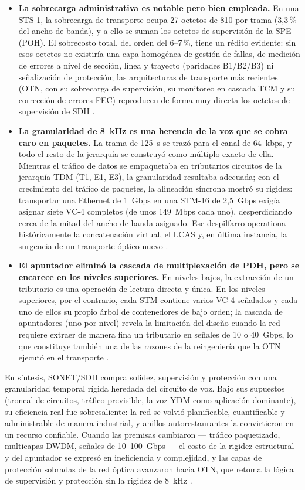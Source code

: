 \documentclass[12pt,a4paper]{article}
\begin{document}
\begin{itemize}
    \item \textbf{La sobrecarga administrativa es notable pero bien empleada.} En una STS-1, la sobrecarga de transporte ocupa 27 octetos de 810 por trama (3{,}3\,\% del ancho de banda), y a ello se suman los octetos de supervisión de la SPE (POH). El sobrecosto total, del orden del 6--7\,\%, tiene un rédito evidente: sin esos octetos no existiría una capa homogénea de gestión de fallas, de medición de errores a nivel de sección, línea y trayecto (paridades B1/B2/B3) ni señalización de protección; las arquitecturas de transporte más recientes (OTN, con su sobrecarga de supervisión, su monitoreo en cascada TCM y su corrección de errores FEC) reproducen de forma muy directa los octetos de supervisión de SDH \cite{itug707, ituG803, ituotn}.
    \item \textbf{La granularidad de 8~kHz es una herencia de la voz que se cobra caro en paquetes.} La trama de 125~\textmu s se trazó para el canal de 64~kbps, y todo el resto de la jerarquía se construyó como múltiplo exacto de ella. Mientras el tráfico de datos se empaquetaba en tributarios circuitos de la jerarquía TDM (T1, E1, E3), la granularidad resultaba adecuada; con el crecimiento del tráfico de paquetes, la alineación síncrona mostró su rigidez: transportar una Ethernet de 1~Gbps en una STM-16 de 2{,}5~Gbps exigía asignar siete VC-4 completos (de unos 149~Mbps cada uno), desperdiciando cerca de la mitad del ancho de banda asignado. Ese despilfarro operationa históricamente la concatenación virtual, el LCAS y, en última instancia, la surgencia de un transporte óptico nuevo \cite{itug707, ituotn}.
    \item \textbf{El apuntador eliminó la cascada de multiplexación de PDH, pero se encarece en los niveles superiores.} En niveles bajos, la extracción de un tributario es una operación de lectura directa y única. En los niveles superiores, por el contrario, cada STM contiene varios VC-4 señalados y cada uno de ellos su propio árbol de contenedores de bajo orden; la cascada de apuntadores (uno por nivel) revela la limitación del diseño cuando la red requiere extraer de manera fina un tributario en señales de 10 o 40~Gbps, lo que constituye también una de las razones de la reingeniería que la OTN ejecutó en el transporte \cite{ituotn}.
\end{itemize}

En síntesis, SONET/SDH compra solidez, supervisión y protección con una granularidad temporal rígida heredada del circuito de voz. Bajo sus supuestos (troncal de circuitos, tráfico previsible, la voz YDM como aplicación dominante), su eficiencia real fue sobresaliente: la red se volvió planificable, cuantificable y administrable de manera industrial, y anillos autorestaurantes la convirtieron en un recurso confiable. Cuando las premisas cambiaron --- tráfico paquetizado, multicapas DWDM, señales de 10--100~Gbps --- el costo de la rigidez estructural y del apuntador se expresó en ineficiencia y complejidad, y las capas de protección sobradas de la red óptica avanzaron hacia OTN, que retoma la lógica de supervisión y protección sin la rigidez de 8~kHz \cite{ituotn, ituG803}.
\end{document}
